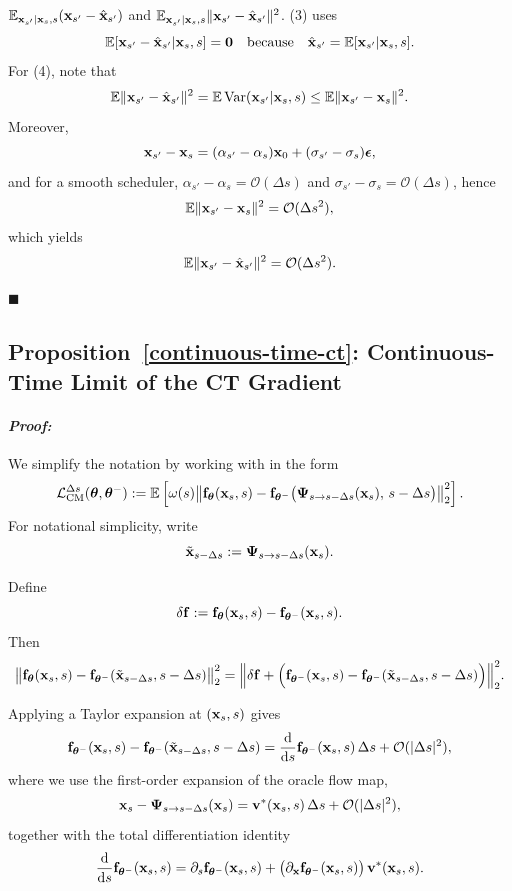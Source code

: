 $\mathbb{E}_{{\mathbf{x}}_{s'}|{\mathbf{x}}_s,s}({\mathbf{x}}_{s'}-\hat{{\mathbf{x}}}_{s'})$ and
$\mathbb{E}_{{\mathbf{x}}_{s'}|{\mathbf{x}}_s,s}\|{\mathbf{x}}_{s'}-\hat{{\mathbf{x}}}_{s'}\|^2$. (3) uses
\[
\mathbb{E}[{\mathbf{x}}_{s'}-\hat{{\mathbf{x}}}_{s'}|{\mathbf{x}}_s,s]=\bm 0
\quad\text{because}\quad
\hat{{\mathbf{x}}}_{s'}=\mathbb{E}[{\mathbf{x}}_{s'}|{\mathbf{x}}_s,s].
\]
For (4), note that
\[
\mathbb{E}\|{\mathbf{x}}_{s'}-\hat{{\mathbf{x}}}_{s'}\|^2
=\mathbb{E}\,\mathrm{Var}({\mathbf{x}}_{s'}|{\mathbf{x}}_s,s)
\le \mathbb{E}\|{\mathbf{x}}_{s'}-{\mathbf{x}}_s\|^2.
\]
Moreover,
\[
{\mathbf{x}}_{s'}-{\mathbf{x}}_s=(\alpha_{s'}-\alpha_s){\mathbf{x}}_0+(\sigma_{s'}-\sigma_s){\bm{\epsilon}},
\]
and for a smooth scheduler, $\alpha_{s'}-\alpha_s=\mathcal{O}(\Delta s)$ and
$\sigma_{s'}-\sigma_s=\mathcal{O}(\Delta s)$, hence
\[
\mathbb{E}\|{\mathbf{x}}_{s'}-{\mathbf{x}}_s\|^2=\mathcal{O}(\Delta s^2),
\]
which yields
\[
\mathbb{E}\|{\mathbf{x}}_{s'}-\hat{{\mathbf{x}}}_{s'}\|^2=\mathcal{O}(\Delta s^2).
\]


\hfill$\blacksquare$


\subsection{Proposition~\ref{continuous-time-ct}: Continuous-Time Limit of the CT Gradient}

\paragraph{\textit{Proof:}}

We simplify the notation by working with  in the form
\begin{align*}
\mathcal{L}_{\mathrm{CM}}^{\Delta s}({\bm{\theta}},{\bm{\theta}}^-)
:=
\mathbb{E} \left[\omega(s)\big\|
{\mathbf{f}}_{{\bm{\theta}}}({\mathbf{x}}_s,s) -
{\mathbf{f}}_{{\bm{\theta}}^-}\big({\bm{\Psi}}_{s\to s-\Delta s}({\mathbf{x}}_s),\, s-\Delta s\big)
\big\|_2^2\right].
\end{align*}
For notational simplicity, write
\[
\tilde{{\mathbf{x}}}_{s-\Delta s}:={\bm{\Psi}}_{s\to s-\Delta s}({\mathbf{x}}_s).
\]

Define
\[
\delta {\mathbf{f}}
:= {\mathbf{f}}_{{\bm{\theta}}}({\mathbf{x}}_s,s)-{\mathbf{f}}_{{\bm{\theta}}^-}({\mathbf{x}}_s,s).
\]
Then
\begin{align*}
\big\|{\mathbf{f}}_{{\bm{\theta}}}({\mathbf{x}}_s, s)- {\mathbf{f}}_{{\bm{\theta}}^-}(\tilde{{\mathbf{x}}}_{s-\Delta s}, s-\Delta s)\big\|_2^2
=
\Big\|\delta {\mathbf{f}}
+
\Big({\mathbf{f}}_{{\bm{\theta}}^-}({\mathbf{x}}_s, s)-{\mathbf{f}}_{{\bm{\theta}}^-}(\tilde{{\mathbf{x}}}_{s-\Delta s}, s-\Delta s)\Big)\Big\|_2^2.
\end{align*}

Applying a Taylor expansion at $({\mathbf{x}}_s,s)$ gives
\begin{align*}
{\mathbf{f}}_{{\bm{\theta}}^-}({\mathbf{x}}_s,s) -
{\mathbf{f}}_{{\bm{\theta}}^-}(\tilde{{\mathbf{x}}}_{s-\Delta s}, s-\Delta s)
=
\frac{\mathop{}\!\mathrm{d}}{\mathop{}\!\mathrm{d} s}{\mathbf{f}}_{{\bm{\theta}}^-}({\mathbf{x}}_s,s)\,\Delta s
+ \mathcal{O}(|\Delta s|^2),
\end{align*}
where we use the first-order expansion of the oracle flow map,
\[
{\mathbf{x}}_s - {\bm{\Psi}}_{s\to s-\Delta s}({\mathbf{x}}_s)
= {\mathbf{v}}^*({\mathbf{x}}_s,s)\,\Delta s + \mathcal{O}(|\Delta s|^2),
\]
together with the total differentiation identity
\[
\frac{\mathop{}\!\mathrm{d}}{\mathop{}\!\mathrm{d} s}{\mathbf{f}}_{{\bm{\theta}}^-}({\mathbf{x}}_s,s)
=
\partial_s {\mathbf{f}}_{{\bm{\theta}}^-}({\mathbf{x}}_s,s)
+
\big(\partial_{{\mathbf{x}}}{\mathbf{f}}_{{\bm{\theta}}^-}({\mathbf{x}}_s,s)\big)\,{\mathbf{v}}^*({\mathbf{x}}_s,s).
\]

